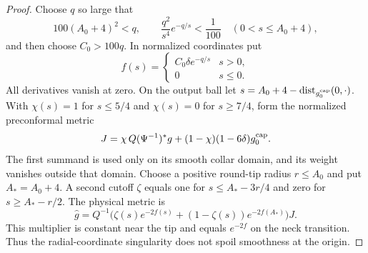 \begin{proof}
Choose $q$ so large that
\[
 100(A_0+4)^2<q,\qquad
 \frac{q^2}{s^4}e^{-q/s}<\frac1{100}
       \quad(0<s\leq A_0+4),
\]
and then choose $C_0>100q$.  In normalized coordinates put
\[
 f(s)=\begin{cases}C_0\delta e^{-q/s}&s>0,\\0&s\leq0.\end{cases}
\]
All derivatives vanish at zero.  On the output ball let
$s=A_0+4-\operatorname{dist}_{g_0^{\rm cap}}(0,\cdot)$.
With $\chi(s)=1$ for $s\leq5/4$ and $\chi(s)=0$ for $s\geq7/4$,
form the normalized preconformal metric
\[
 J=\chi\,Q(\Psi^{-1})^*g+(1-\chi)(1-6\delta)g_0^{\rm cap}.
\]
The first summand is used only on its smooth collar domain, and its
weight vanishes outside that domain.  Choose a positive round-tip
radius $r\leq A_0$ and put $A_*=A_0+4$.  A second cutoff $\zeta$
equals one for $s\leq A_*-3r/4$ and zero for $s\geq A_*-r/2$.
The physical metric is
\[
 \widehat g=Q^{-1}
 \bigl(\zeta(s)e^{-2f(s)}+(1-\zeta(s))e^{-2f(A_*)}\bigr)J.
\]
This multiplier is constant near the tip and equals $e^{-2f}$ on
the neck transition.  Thus the radial-coordinate singularity does
not spoil smoothness at the origin.


\end{proof}
